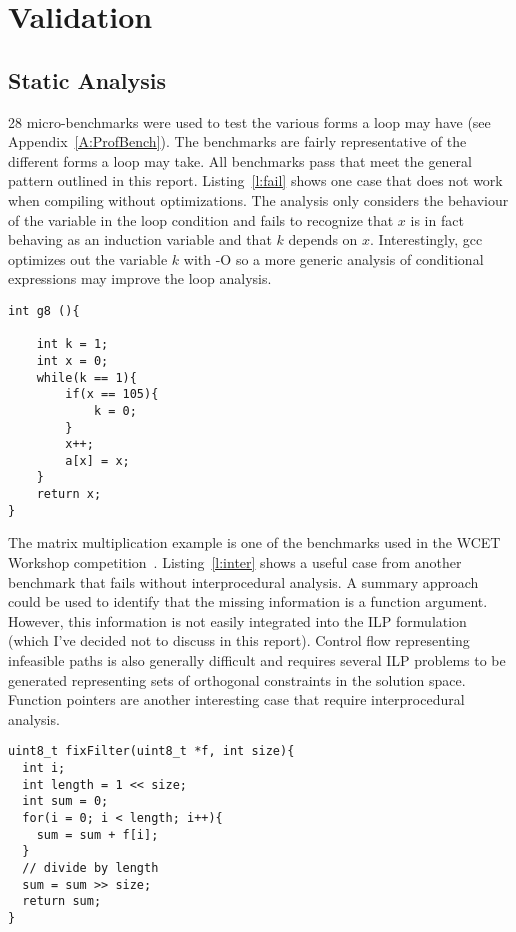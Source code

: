 

\section{Validation}
\subsection{Static Analysis}
28 micro-benchmarks were used to test the various forms a loop may have (see Appendix~\ref{A:ProfBench}). The benchmarks are fairly representative of the different forms a loop may take. All benchmarks pass that meet the general pattern outlined in this report. Listing~\ref{l:fail} shows one case that does not work when compiling without optimizations. The analysis only considers the behaviour of the variable in the loop condition and fails to recognize that $x$ is in fact behaving as an induction variable and that $k$ depends on $x$. Interestingly, gcc optimizes out the variable $k$ with -O so a more generic analysis of conditional expressions may improve the loop analysis.

\begin{lstlisting}[caption={Indirect test on induction variable fails.},label=l:fail]
int g8 (){

	int k = 1;
	int x = 0;
	while(k == 1){
		if(x == 105){
			k = 0;
		}
		x++;
		a[x] = x;
	}
	return x;
}
\end{lstlisting}

The matrix multiplication example is one of the benchmarks used in the WCET Workshop competition~\cite{wcetcomp}. Listing~\ref{l:inter} shows a useful case from another benchmark that fails without interprocedural analysis. A summary approach could be used to identify that the missing information is a function argument. However, this information is not easily integrated into the ILP formulation (which I've decided not to discuss in this report). Control flow representing infeasible paths is also generally difficult and requires several ILP problems to be generated representing sets of orthogonal constraints in the solution space. Function pointers are another interesting case that require interprocedural analysis.

\begin{lstlisting}[caption={Interprocedural analysis is necessary to analyze programs that call a function which takes the threshold as an argument.},label={l:inter}]
uint8_t fixFilter(uint8_t *f, int size){
  int i;
  int length = 1 << size;
  int sum = 0;
  for(i = 0; i < length; i++){
    sum = sum + f[i];	
  }   
  // divide by length
  sum = sum >> size;
  return sum;
}
\end{lstlisting}

